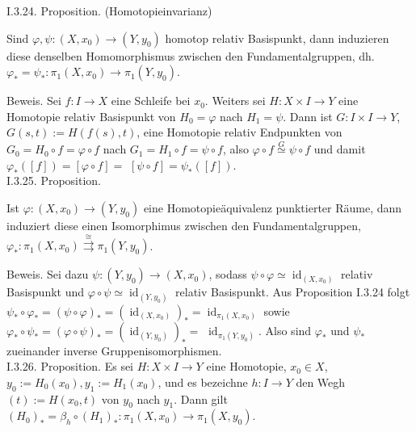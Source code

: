 \documentclass[10pt, letterpaper]{article}
\begin{document}
I.3.24. Proposition. (Homotopieinvarianz) 

Sind $\varphi, \psi:\left(X, x_{0}\right) \rightarrow\left(Y, y_{0}\right)$ homotop relativ Basispunkt, dann induzieren diese denselben Homomorphismus zwischen den Fundamentalgruppen, dh. $\varphi_{*}=\psi_{*}: \pi_{1}\left(X, x_{0}\right) \rightarrow \pi_{1}\left(Y, y_{0}\right)$.

Beweis. Sei $f: I \rightarrow X$ eine Schleife bei $x_{0}$. Weiters sei $H: X \times I \rightarrow Y$ eine Homotopie relativ Basispunkt von $H_{0}=\varphi$ nach $H_{1}=\psi$. Dann ist $G: I \times I \rightarrow Y$, $G(s, t):=H(f(s), t)$, eine Homotopie relativ Endpunkten von $G_{0}=H_{0} \circ f=\varphi \circ f$ nach $G_{1}=H_{1} \circ f=\psi \circ f$, also $\varphi \circ f \stackrel{G}{\simeq} \psi \circ f$ und damit $\varphi_{*}([f])=[\varphi \circ f]=$ $[\psi \circ f]=\psi_{*}([f])$.\\



I.3.25. Proposition. 


Ist $\varphi:\left(X, x_{0}\right) \rightarrow\left(Y, y_{0}\right)$ eine Homotopieäquivalenz punktierter Räume, dann induziert diese einen Isomorphimus zwischen den Fundamentalgruppen, $\varphi_{*}: \pi_{1}\left(X, x_{0}\right) \stackrel{\cong}{\rightrightarrows} \pi_{1}\left(Y, y_{0}\right)$.

Beweis. Sei dazu $\psi:\left(Y, y_{0}\right) \rightarrow\left(X, x_{0}\right)$, sodass $\psi \circ \varphi \simeq \operatorname{id}_{\left(X, x_{0}\right)}$ relativ Basispunkt und $\varphi \circ \psi \simeq \operatorname{id}_{\left(Y, y_{0}\right)}$ relativ Basispunkt. Aus Proposition I.3.24 folgt $\psi_{*} \circ \varphi_{*}=(\psi \circ \varphi)_{*}=\left(\operatorname{id}_{\left(X, x_{0}\right)}\right)_{*}=\operatorname{id}_{\pi_{1}\left(X, x_{0}\right)}$ sowie $\varphi_{*} \circ \psi_{*}=(\varphi \circ \psi)_{*}=\left(\operatorname{id}_{\left(Y, y_{0}\right)}\right)_{*}=$ $\operatorname{id}_{\pi_{1}\left(Y, y_{0}\right)}$. Also sind $\varphi_{*}$ und $\psi_{*}$ zueinander inverse Gruppenisomorphismen.\\
I.3.26. Proposition. Es sei $H: X \times I \rightarrow Y$ eine Homotopie, $x_{0} \in X$, $y_{0}:=H_{0}\left(x_{0}\right), y_{1}:=H_{1}\left(x_{0}\right)$, und es bezeichne $h: I \rightarrow Y$ den Wegh $(t):=H\left(x_{0}, t\right)$ von $y_{0}$ nach $y_{1}$. Dann gilt $\left(H_{0}\right)_{*}=\beta_{h} \circ\left(H_{1}\right)_{*}: \pi_{1}\left(X, x_{0}\right) \rightarrow \pi_{1}\left(X, y_{0}\right)$.
\end{document}
